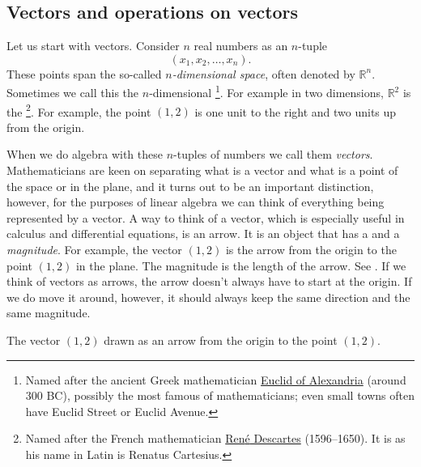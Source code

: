 \subsection{Vectors and operations on vectors}

Let us start with vectors.  Consider $n$ real numbers as an
$n$-tuple
\begin{equation*}
(x_1,x_2,\ldots,x_n). 
\end{equation*}
These points span the so-called
\emph{$n$-dimensional space},
often denoted by ${\mathbb R}^n$.
Sometimes we call this the $n$-dimensional
\emph{}%
\footnote{Named after the ancient Greek mathematician
\href{https://en.wikipedia.org/wiki/Euclid}{Euclid of Alexandria}
(around 300 BC), possibly the most famous of mathematicians; even
small towns often have Euclid Street or Euclid Avenue.}. 
For example in two dimensions, ${\mathbb R}^2$ is the
\emph{}%
\footnote{Named after the French mathematician
\href{https://en.wikipedia.org/wiki/Descartes}{Ren{\'e} Descartes}
(1596--1650).  It is  as his name in Latin is Renatus
Cartesius.}. 
For example,
the point $(1,2)$ is one unit to the right and two units up from the
origin.

When we do algebra with these $n$-tuples of numbers we call them
\emph{vectors}.  Mathematicians are keen on separating
what is a vector and what is a point of the space or in the plane,
and it turns out
to be an important distinction, however, for the purposes of linear algebra
we can think of everything being represented by a vector.
A way to think of a vector, which is especially useful in calculus
and differential equations, is an arrow.  It is an object that has
a \emph{} and a \emph{magnitude}.
For example, the vector $(1,2)$
is the arrow from the origin to the point $(1,2)$ in the plane.
The magnitude is the length of the arrow.
See .
If we think of vectors as arrows,
the arrow doesn't always have to start at the origin.  If we do move it
around, however, it should always keep the same direction and the same magnitude.

\begin{myfig}
\capstart
{}
\caption{The vector $(1,2)$ drawn as an arrow from the origin to the point
$(1,2)$.\label{linalg-vecarrow:fig}}
\end{myfig}

